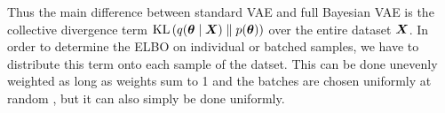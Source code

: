 

Thus the main difference between standard VAE and full Bayesian VAE is the collective divergence term $\operatorname{KL}{\mathopen{} \left(q(\bm{ \theta } \mid \bm{ X }) \parallel p(\bm{ \theta })\right) \mathclose{}}$ over the entire dataset $\bm{ X }$. In order to determine the ELBO on individual or batched samples, we have to distribute this term onto each sample of the datset. This can be done unevenly weighted as long as weights sum to 1 and the batches are chosen uniformly at random \cite{blundell2015weight}, but it can also simply be done uniformly.